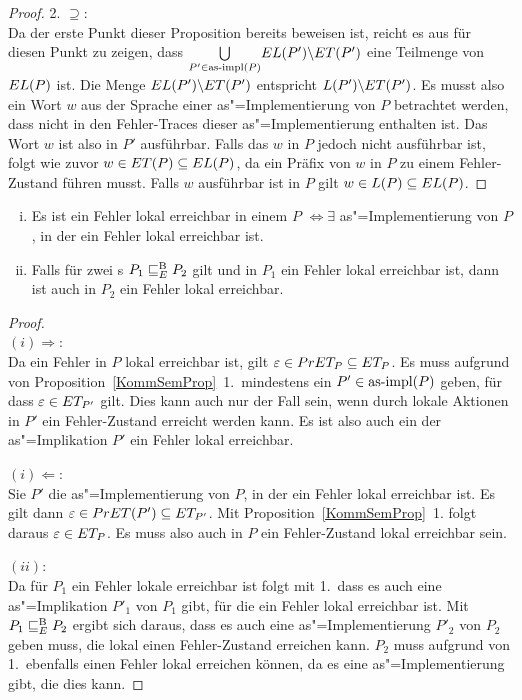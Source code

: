 \begin{proof}
  2. \glqq$\supseteq$\grqq{}:\\
  Da der erste Punkt dieser Proposition bereits beweisen ist, reicht es aus für
  diesen Punkt zu zeigen, dass $\underset{P'\in\mathrm{as}\text{-}\mathrm{impl} (P)}{\bigcup} EL
  (P')\backslash ET (P')$ eine Teilmenge von $EL (P)$ ist. Die Menge $EL
  (P')\backslash ET (P')$ entspricht $L (P') \backslash ET (P')$. Es musst
  also ein Wort $w$ aus der Sprache einer as"=Implementierung von $P$
  betrachtet werden, dass nicht in den Fehler-Traces dieser as"=Implementierung
  enthalten ist. Das Wort $w$ ist also in $P'$ ausführbar. Falls das $w$ in $P$
  jedoch nicht ausführbar ist, folgt wie zuvor $w\in ET (P)\subseteq EL (P)$,
  da ein Präfix von $w$ in $P$ zu einem Fehler-Zustand führen musst. Falls $w$
  ausführbar ist in $P$ gilt $w\in L(P)\subseteq EL (P)$.
\end{proof}

\begin{Kor}\mbox{}
  \label{lokalFehlerErrKor}
  \begin{enumerate}[(i)]
    \item Es ist ein Fehler lokal erreichbar in einem \MEIO{} $P$
      $\Leftrightarrow \exists$ as"=Implementierung von $P$, in der ein Fehler
      lokal erreichbar ist.
    \item Falls für zwei \MEIO{}s $P_1 \sqsubseteq  _E^\mathrm{B} P_2$ gilt und in $P_1$ ein Fehler
      lokal erreichbar ist, dann ist auch in $P_2$ ein Fehler lokal erreichbar.
  \end{enumerate}
\end{Kor}
\begin{proof}\mbox{}\\
  $(i) \Rightarrow$:\\
  Da ein Fehler in $P$ lokal erreichbar ist, gilt $\varepsilon \in PrET _P
  \subseteq ET _P$. Es muss aufgrund von Proposition~\ref{KommSemProp}~1.\
  mindestens ein $P'\in\mathrm{as}\text{-}\mathrm{impl} (P)$ geben, für dass $\varepsilon \in ET _{P'}$
  gilt. Dies kann auch nur der Fall sein, wenn durch lokale Aktionen in $P'$
  ein Fehler-Zustand erreicht werden kann. Es ist also auch ein der
  as"=Implikation $P'$ ein Fehler lokal erreichbar.

  $(i) \Leftarrow$:\\
  Sie $P'$ die as"=Implementierung von $P$, in der ein Fehler lokal erreichbar
  ist. Es gilt dann $\varepsilon\in PrET (P') \subseteq ET _{P'}$. Mit
  Proposition~\ref{KommSemProp}~1. folgt daraus $\varepsilon \in ET _P$. Es
  muss also auch in $P$ ein Fehler-Zustand lokal erreichbar sein.

  $(ii)$:\\
  Da für $P_1$ ein Fehler lokale erreichbar ist folgt mit 1.\, dass es auch
  eine as"=Implikation $P'_1$ von $P_1$ gibt, für die ein Fehler lokal
  erreichbar ist. Mit $P_1 \sqsubseteq  _E^\mathrm{B} P_2$ ergibt sich daraus, dass es auch eine
  as"=Implementierung $P'_2$ von $P_2$ geben muss, die lokal einen
  Fehler-Zustand erreichen kann. $P_2$ muss aufgrund von 1.\ ebenfalls einen
  Fehler lokal erreichen können, da es eine as"=Implementierung gibt, die dies
  kann.
\end{proof}

